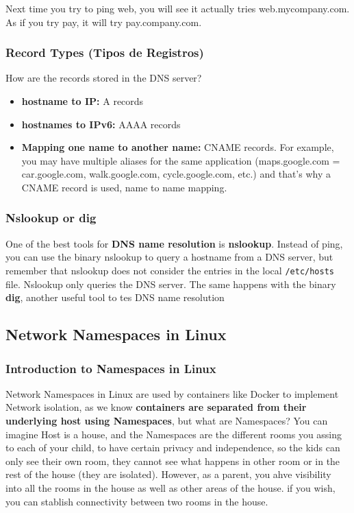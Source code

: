 \documentclass{article}
\begin{document}
Next time you try to ping web, you will see it actually tries web.mycompany.com. As if you try pay, it will try pay.company.com.

\subsubsection{Record Types (Tipos de Registros)}

How are the records stored in the DNS server?

\begin{itemize}
    \item \textbf{hostname to IP:} A records
    \item \textbf{hostnames to IPv6:} AAAA records
    \item \textbf{Mapping one name to another name:} CNAME records. For example, you may have multiple aliases for the same application (maps.google.com = car.google.com, walk.google.com, cycle.google.com, etc.) and that's why a CNAME record is used, name to name mapping.
\end{itemize}

\subsubsection{Nslookup or dig}
One of the best tools for \textbf{DNS name resolution} is \textbf{nslookup}. Instead of ping, you can use the binary nslookup to query a hostname from a DNS server, but remember that nslookup does not consider the entries in the local \verb|/etc/hosts| file. Nslookup only queries the DNS server. The same happens with the binary \textbf{dig}, another useful tool to tes DNS name resolution

\subsection{Network Namespaces in Linux}

\subsubsection{Introduction to Namespaces in Linux}

Network Namespaces in Linux are used by containers like Docker to implement Network isolation, as we know \textbf{containers are separated from their underlying host using Namespaces}, but what are Namespaces? You can imagine Host is a house, and the Namespaces are the different rooms you assing to each of your child, to have certain privacy and independence, so the kids can only see their own room, they cannot see what happens in other room or in the rest of the house (they are isolated). However, as a parent, you ahve visibility into all the rooms in the house as well as other areas of the house. if you wish, you can stablish connectivity between two rooms in the house.
\end{document}
